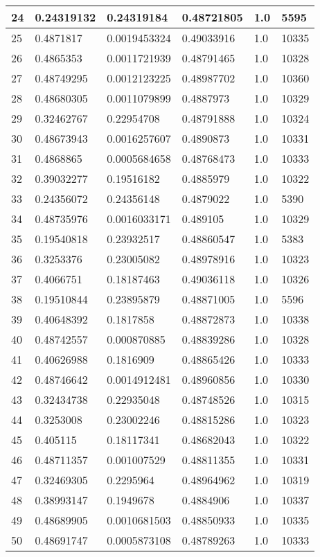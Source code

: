 \begin{longtable}{|l|l|l|l|l|l|}
24 & 0.24319132 & 0.24319184 & 0.48721805 & 1.0 & 5595 \\ \hline 
25 & 0.4871817 & 0.0019453324 & 0.49033916 & 1.0 & 10335 \\ \hline 
26 & 0.4865353 & 0.0011721939 & 0.48791465 & 1.0 & 10328 \\ \hline 
27 & 0.48749295 & 0.0012123225 & 0.48987702 & 1.0 & 10360 \\ \hline 
28 & 0.48680305 & 0.0011079899 & 0.4887973 & 1.0 & 10329 \\ \hline 
29 & 0.32462767 & 0.22954708 & 0.48791888 & 1.0 & 10324 \\ \hline 
30 & 0.48673943 & 0.0016257607 & 0.4890873 & 1.0 & 10331 \\ \hline 
31 & 0.4868865 & 0.0005684658 & 0.48768473 & 1.0 & 10333 \\ \hline 
32 & 0.39032277 & 0.19516182 & 0.4885979 & 1.0 & 10322 \\ \hline 
33 & 0.24356072 & 0.24356148 & 0.4879022 & 1.0 & 5390 \\ \hline 
34 & 0.48735976 & 0.0016033171 & 0.489105 & 1.0 & 10329 \\ \hline 
35 & 0.19540818 & 0.23932517 & 0.48860547 & 1.0 & 5383 \\ \hline 
36 & 0.3253376 & 0.23005082 & 0.48978916 & 1.0 & 10323 \\ \hline 
37 & 0.4066751 & 0.18187463 & 0.49036118 & 1.0 & 10326 \\ \hline 
38 & 0.19510844 & 0.23895879 & 0.48871005 & 1.0 & 5596 \\ \hline 
39 & 0.40648392 & 0.1817858 & 0.48872873 & 1.0 & 10338 \\ \hline 
40 & 0.48742557 & 0.000870885 & 0.48839286 & 1.0 & 10328 \\ \hline 
41 & 0.40626988 & 0.1816909 & 0.48865426 & 1.0 & 10333 \\ \hline 
42 & 0.48746642 & 0.0014912481 & 0.48960856 & 1.0 & 10330 \\ \hline 
43 & 0.32434738 & 0.22935048 & 0.48748526 & 1.0 & 10315 \\ \hline 
44 & 0.3253008 & 0.23002246 & 0.48815286 & 1.0 & 10323 \\ \hline 
45 & 0.405115 & 0.18117341 & 0.48682043 & 1.0 & 10322 \\ \hline 
46 & 0.48711357 & 0.001007529 & 0.48811355 & 1.0 & 10331 \\ \hline 
47 & 0.32469305 & 0.2295964 & 0.48964962 & 1.0 & 10319 \\ \hline 
48 & 0.38993147 & 0.1949678 & 0.4884906 & 1.0 & 10337 \\ \hline 
49 & 0.48689905 & 0.0010681503 & 0.48850933 & 1.0 & 10335 \\ \hline 
50 & 0.48691747 & 0.0005873108 & 0.48789263 & 1.0 & 10333 \\ \hline 
\end{longtable}